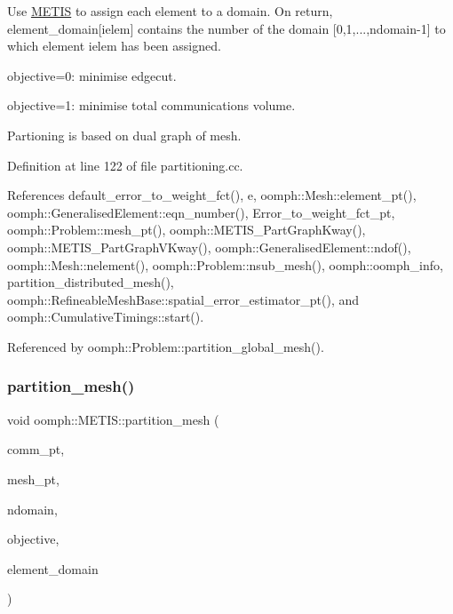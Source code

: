 Use \hyperlink{namespaceoomph_1_1METIS}{M\+E\+T\+IS} to assign each element to a domain. On return, element\+\_\+domain\mbox{[}ielem\mbox{]} contains the number of the domain \mbox{[}0,1,...,ndomain-\/1\mbox{]} to which element ielem has been assigned.
\begin{DoxyItemize}
\item objective=0\+: minimise edgecut.
\item objective=1\+: minimise total communications volume.
\end{DoxyItemize}Partioning is based on dual graph of mesh. 

Definition at line 122 of file partitioning.\+cc.



References default\+\_\+error\+\_\+to\+\_\+weight\+\_\+fct(), e, oomph\+::\+Mesh\+::element\+\_\+pt(), oomph\+::\+Generalised\+Element\+::eqn\+\_\+number(), Error\+\_\+to\+\_\+weight\+\_\+fct\+\_\+pt, oomph\+::\+Problem\+::mesh\+\_\+pt(), oomph\+::\+M\+E\+T\+I\+S\+\_\+\+Part\+Graph\+Kway(), oomph\+::\+M\+E\+T\+I\+S\+\_\+\+Part\+Graph\+V\+Kway(), oomph\+::\+Generalised\+Element\+::ndof(), oomph\+::\+Mesh\+::nelement(), oomph\+::\+Problem\+::nsub\+\_\+mesh(), oomph\+::oomph\+\_\+info, partition\+\_\+distributed\+\_\+mesh(), oomph\+::\+Refineable\+Mesh\+Base\+::spatial\+\_\+error\+\_\+estimator\+\_\+pt(), and oomph\+::\+Cumulative\+Timings\+::start().



Referenced by oomph\+::\+Problem\+::partition\+\_\+global\+\_\+mesh().

\mbox{\label{namespaceoomph_1_1METIS_a7504999ec1517cc95d0393753a714fe9}} 
\subsubsection{\texorpdfstring{partition\+\_\+mesh()}{partition\_mesh()}\hspace{0.1cm}{\footnotesize\ttfamily [2/2]}}
{\footnotesize\ttfamily void oomph\+::\+M\+E\+T\+I\+S\+::partition\+\_\+mesh (\begin{DoxyParamCaption}\item[{\hyperlink{classoomph_1_1OomphCommunicator}{Oomph\+Communicator} $\ast$}]{comm\+\_\+pt,  }\item[{\hyperlink{classoomph_1_1Mesh}{Mesh} $\ast$}]{mesh\+\_\+pt,  }\item[{const unsigned \&}]{ndomain,  }\item[{const unsigned \&}]{objective,  }\item[{\hyperlink{classoomph_1_1Vector}{Vector}$<$ unsigned $>$ \&}]{element\+\_\+domain }\end{DoxyParamCaption})}



